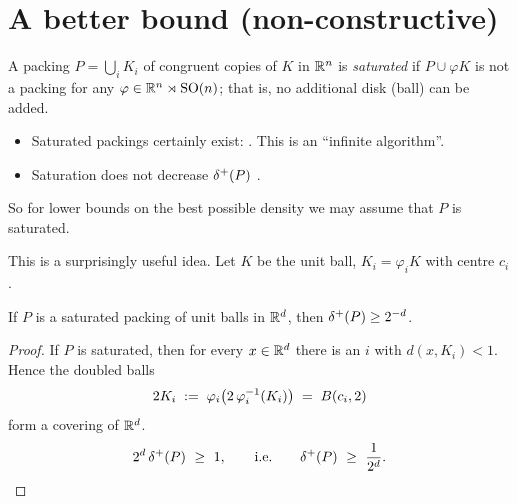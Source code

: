 \section{A better bound (non-constructive)}
\label{L1:sec:saturation}

\begin{definition}
\label{L1:def:saturated}
A packing $P=\bigcup_i K_i$ of congruent copies of $K$ in $\mathbb{R}^n$ is \emph{saturated} if
$P\cup\varphi K$ is not a packing for any $\varphi\in\mathbb{R}^n\rtimes\mathrm{SO}(n)$; that is,
no additional disk (ball) can be added.
\end{definition}

\begin{itemize}[nosep]
  \item Saturated packings certainly exist: . This is an ``infinite algorithm''. 
  \item Saturation does not decrease $\delta^+(P)$ .
\end{itemize}
So for lower bounds on the best possible density we may assume that $P$ is saturated.

This is a surprisingly useful idea. Let $K$ be the unit ball, $K_i=\varphi_i K$ with centre $c_i$.

\begin{proposition}
\label{L1:prop:saturated-bound}
If $P$ is a saturated packing of unit balls in $\mathbb{R}^d$, then $\delta^+(P)\ge 2^{-d}$.
\end{proposition}

\begin{proof}
If $P$ is saturated, then for every $x\in\mathbb{R}^d$ there is an $i$ with $d(x,K_i)<1$.
Hence the doubled balls
\[
  2K_i\;:=\;\varphi_i\bigl(2\,\varphi_i^{-1}(K_i)\bigr)\;=\;B(c_i,2)
\]
form a covering of $\mathbb{R}^d$. 
\[
  2^d\,\delta^+(P)\ \ge\ 1,\qquad\text{i.e.}\qquad \delta^+(P)\ \ge\ \frac1{2^d}. \qedhere
\]
\end{proof}

